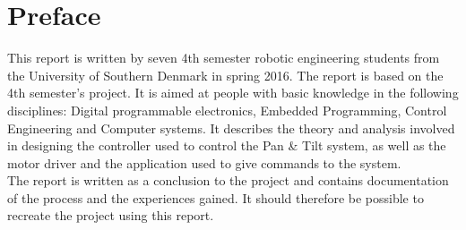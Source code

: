 \section*{Preface}

This report is written by seven 4th semester robotic engineering students from the University of Southern Denmark in spring 2016. The report is based on the 4th semester's project.
It is aimed at people with basic knowledge in the following disciplines: Digital programmable electronics, Embedded Programming, Control Engineering and Computer systems.
It describes the theory and analysis involved in designing the controller used to control the Pan \& Tilt system, as well as the motor driver and the application used to give commands to the system.\\
The report is written as a conclusion to the project and contains documentation of the process and the experiences gained. It should therefore be possible to recreate the project using this report.